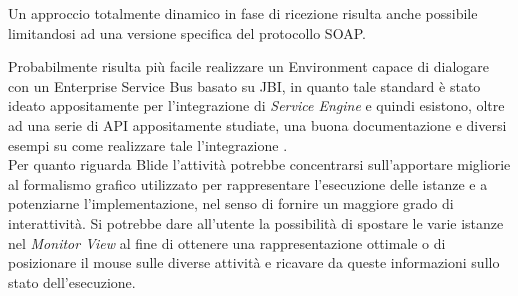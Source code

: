Un approccio totalmente dinamico in fase di ricezione risulta anche possibile
limitandosi ad una versione specifica del protocollo SOAP.

Probabilmente risulta più facile realizzare un Environment capace di dialogare
con un Enterprise Service Bus basato su JBI, in quanto tale standard è stato
ideato appositamente per l'integrazione di \emph{Service Engine} e quindi
esistono, oltre ad una serie di API appositamente studiate, una buona
documentazione e diversi esempi su come realizzare tale l'integrazione
\cite{OPENESB}.
\\

Per quanto riguarda Blide l'attività potrebbe concentrarsi sull'apportare
migliorie al formalismo grafico utilizzato per rappresentare l'esecuzione delle
istanze e a potenziarne l'implementazione, nel senso di fornire un maggiore
grado di interattività. Si potrebbe dare all'utente la possibilità di spostare
le varie istanze nel \emph{Monitor View} al fine di ottenere una
rappresentazione ottimale o di posizionare il mouse sulle diverse attività e
ricavare da queste informazioni sullo stato dell'esecuzione.





